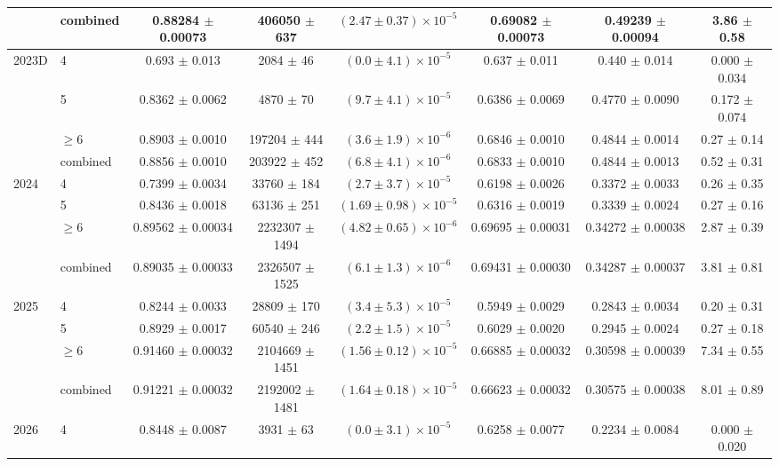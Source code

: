 \begin{table}
\begin{tiny}
\begin{tabular}{llcccccc}
 & combined & 0.88284 $\pm$ 0.00073 & 406050 $\pm$ 637 & $(2.47 \pm 0.37) \times 10^{-5}$ & 0.69082 $\pm$ 0.00073 & 0.49239 $\pm$ 0.00094 & 3.86 $\pm$ 0.58 \\
\hline
\multirow{4}{*}{2023D} & 4 & 0.693 $\pm$ 0.013 & 2084 $\pm$ 46 & $(0.0 \pm 4.1) \times 10^{-5}$ & 0.637 $\pm$ 0.011 & 0.440 $\pm$ 0.014 & 0.000 $\pm$ 0.034 \\
 & 5 & 0.8362 $\pm$ 0.0062 & 4870 $\pm$ 70 & $(9.7 \pm 4.1) \times 10^{-5}$ & 0.6386 $\pm$ 0.0069 & 0.4770 $\pm$ 0.0090 & 0.172 $\pm$ 0.074 \\
 & $\geq 6$ & 0.8903 $\pm$ 0.0010 & 197204 $\pm$ 444 & $(3.6 \pm 1.9) \times 10^{-6}$ & 0.6846 $\pm$ 0.0010 & 0.4844 $\pm$ 0.0014 & 0.27 $\pm$ 0.14 \\
 & combined & 0.8856 $\pm$ 0.0010 & 203922 $\pm$ 452 & $(6.8 \pm 4.1) \times 10^{-6}$ & 0.6833 $\pm$ 0.0010 & 0.4844 $\pm$ 0.0013 & 0.52 $\pm$ 0.31 \\
\hline
\multirow{4}{*}{2024} & 4 & 0.7399 $\pm$ 0.0034 & 33760 $\pm$ 184 & $(2.7 \pm 3.7) \times 10^{-5}$ & 0.6198 $\pm$ 0.0026 & 0.3372 $\pm$ 0.0033 & 0.26 $\pm$ 0.35 \\
 & 5 & 0.8436 $\pm$ 0.0018 & 63136 $\pm$ 251 & $(1.69 \pm 0.98) \times 10^{-5}$ & 0.6316 $\pm$ 0.0019 & 0.3339 $\pm$ 0.0024 & 0.27 $\pm$ 0.16 \\
 & $\geq 6$ & 0.89562 $\pm$ 0.00034 & 2232307 $\pm$ 1494 & $(4.82 \pm 0.65) \times 10^{-6}$ & 0.69695 $\pm$ 0.00031 & 0.34272 $\pm$ 0.00038 & 2.87 $\pm$ 0.39 \\
 & combined & 0.89035 $\pm$ 0.00033 & 2326507 $\pm$ 1525 & $(6.1 \pm 1.3) \times 10^{-6}$ & 0.69431 $\pm$ 0.00030 & 0.34287 $\pm$ 0.00037 & 3.81 $\pm$ 0.81 \\
\hline
\multirow{4}{*}{2025} & 4 & 0.8244 $\pm$ 0.0033 & 28809 $\pm$ 170 & $(3.4 \pm 5.3) \times 10^{-5}$ & 0.5949 $\pm$ 0.0029 & 0.2843 $\pm$ 0.0034 & 0.20 $\pm$ 0.31 \\
 & 5 & 0.8929 $\pm$ 0.0017 & 60540 $\pm$ 246 & $(2.2 \pm 1.5) \times 10^{-5}$ & 0.6029 $\pm$ 0.0020 & 0.2945 $\pm$ 0.0024 & 0.27 $\pm$ 0.18 \\
 & $\geq 6$ & 0.91460 $\pm$ 0.00032 & 2104669 $\pm$ 1451 & $(1.56 \pm 0.12) \times 10^{-5}$ & 0.66885 $\pm$ 0.00032 & 0.30598 $\pm$ 0.00039 & 7.34 $\pm$ 0.55 \\
 & combined & 0.91221 $\pm$ 0.00032 & 2192002 $\pm$ 1481 & $(1.64 \pm 0.18) \times 10^{-5}$ & 0.66623 $\pm$ 0.00032 & 0.30575 $\pm$ 0.00038 & 8.01 $\pm$ 0.89 \\
\hline
\multirow{4}{*}{2026} & 4 & 0.8448 $\pm$ 0.0087 & 3931 $\pm$ 63 & $(0.0 \pm 3.1) \times 10^{-5}$ & 0.6258 $\pm$ 0.0077 & 0.2234 $\pm$ 0.0084 & 0.000 $\pm$ 0.020 \\

\end{tabular}
\end{tiny}
\end{table}
